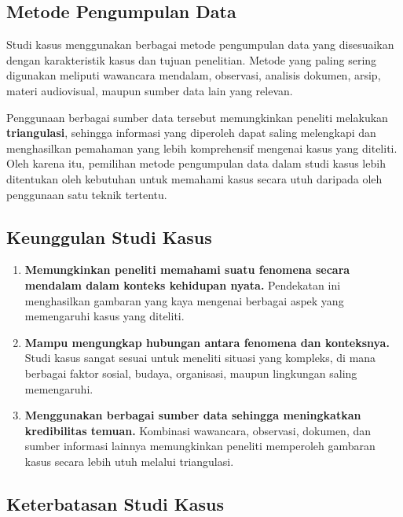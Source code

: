 \documentclass[
  indonesian,
  letterpaper,
  DIV=11,
  numbers=noendperiod]{scrreprt}
\providecommand{\tightlist}{%
  \setlength{\itemsep}{0pt}\setlength{\parskip}{0pt}}
\begin{document}
\subsection{Metode Pengumpulan Data}\label{metode-pengumpulan-data-2}

Studi kasus menggunakan berbagai metode pengumpulan data yang
disesuaikan dengan karakteristik kasus dan tujuan penelitian. Metode
yang paling sering digunakan meliputi wawancara mendalam, observasi,
analisis dokumen, arsip, materi audiovisual, maupun sumber data lain
yang relevan.

Penggunaan berbagai sumber data tersebut memungkinkan peneliti melakukan
\textbf{triangulasi}, sehingga informasi yang diperoleh dapat saling
melengkapi dan menghasilkan pemahaman yang lebih komprehensif mengenai
kasus yang diteliti. Oleh karena itu, pemilihan metode pengumpulan data
dalam studi kasus lebih ditentukan oleh kebutuhan untuk memahami kasus
secara utuh daripada oleh penggunaan satu teknik tertentu.

\subsection{Keunggulan Studi Kasus}\label{keunggulan-studi-kasus}

\begin{enumerate}
\def\labelenumi{\arabic{enumi}.}
\tightlist
\item
  \textbf{Memungkinkan peneliti memahami suatu fenomena secara mendalam
  dalam konteks kehidupan nyata.} Pendekatan ini menghasilkan gambaran
  yang kaya mengenai berbagai aspek yang memengaruhi kasus yang
  diteliti.
\item
  \textbf{Mampu mengungkap hubungan antara fenomena dan konteksnya.}
  Studi kasus sangat sesuai untuk meneliti situasi yang kompleks, di
  mana berbagai faktor sosial, budaya, organisasi, maupun lingkungan
  saling memengaruhi.
\item
  \textbf{Menggunakan berbagai sumber data sehingga meningkatkan
  kredibilitas temuan.} Kombinasi wawancara, observasi, dokumen, dan
  sumber informasi lainnya memungkinkan peneliti memperoleh gambaran
  kasus secara lebih utuh melalui triangulasi.
\end{enumerate}

\subsection{Keterbatasan Studi Kasus}\label{keterbatasan-studi-kasus}
\end{document}
